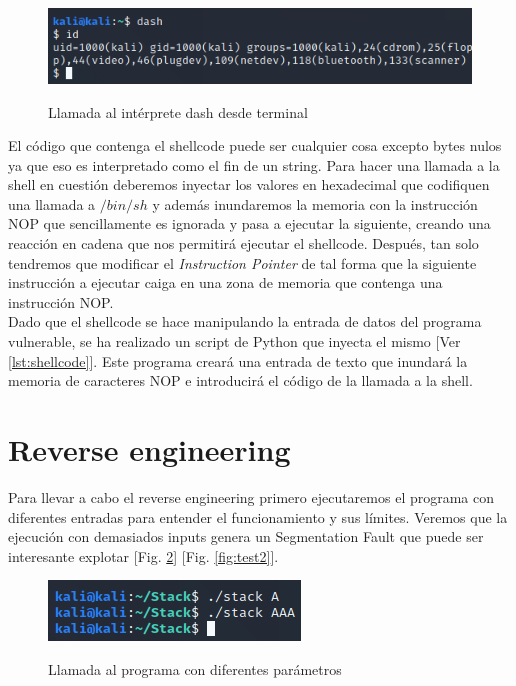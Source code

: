 \documentclass[a4paper,oneside]{article}
\begin{document}
\begin{figure}[h!]
  \centering
  \includegraphics[scale=0.7]{images/dash.png}\\
  \caption{Llamada al intérprete dash desde terminal}
  \label{fig:dash}
\end{figure}

El código que contenga el shellcode puede ser cualquier cosa excepto bytes nulos ya que eso es interpretado como el fin de un string. Para hacer una llamada a la shell en cuestión deberemos inyectar los valores en hexadecimal que codifiquen una llamada a $/bin/sh$ y además inundaremos la memoria con la instrucción NOP que sencillamente es ignorada y pasa a ejecutar la siguiente, creando una reacción en cadena que nos permitirá ejecutar el shellcode. Después, tan solo tendremos que modificar el \textit{Instruction Pointer} de tal forma que la siguiente instrucción a ejecutar caiga en una zona de memoria que contenga una instrucción NOP.\\

Dado que el shellcode se hace manipulando la entrada de datos del programa vulnerable, se ha realizado un script de Python que inyecta el mismo [Ver \ref{lst:shellcode}]. Este programa creará una entrada de texto que inundará la memoria de caracteres NOP e introducirá el código de la llamada a la shell.

\section{Reverse engineering}

Para llevar a cabo el reverse engineering primero ejecutaremos el programa con diferentes entradas para entender el funcionamiento y sus límites. Veremos que la ejecución con demasiados inputs genera un Segmentation Fault que puede ser interesante explotar [Fig. \ref{fig:test1}] [Fig. \ref{fig:test2}].

\begin{figure}[h!]
  \centering
  \includegraphics[scale=0.7]{images/test.png}\\
  \caption{Llamada al programa con diferentes parámetros}
  \label{fig:test1}
\end{figure}
\end{document}
